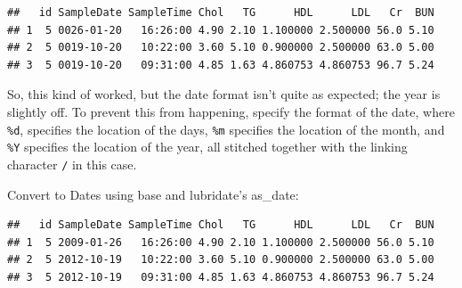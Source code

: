 \documentclass[
]{book}
\newenvironment{Shaded}{\begin{snugshade}}{\end{snugshade}}
\newcommand{\AttributeTok}[1]{\textcolor[rgb]{0.13,0.29,0.53}{#1}}
\newcommand{\CommentTok}[1]{\textcolor[rgb]{0.56,0.35,0.01}{\textit{#1}}}
\newcommand{\DataTypeTok}[1]{\textcolor[rgb]{0.13,0.29,0.53}{#1}}
\newcommand{\DecValTok}[1]{\textcolor[rgb]{0.00,0.00,0.81}{#1}}
\newcommand{\FunctionTok}[1]{\textcolor[rgb]{0.13,0.29,0.53}{\textbf{#1}}}
\newcommand{\NormalTok}[1]{#1}
\newcommand{\OtherTok}[1]{\textcolor[rgb]{0.56,0.35,0.01}{#1}}
\newcommand{\SpecialCharTok}[1]{\textcolor[rgb]{0.81,0.36,0.00}{\textbf{#1}}}
\newcommand{\StringTok}[1]{\textcolor[rgb]{0.31,0.60,0.02}{#1}}
\begin{document}
\begin{verbatim}
##   id SampleDate SampleTime Chol   TG      HDL      LDL   Cr  BUN
## 1  5 0026-01-20   16:26:00 4.90 2.10 1.100000 2.500000 56.0 5.10
## 2  5 0019-10-20   10:22:00 3.60 5.10 0.900000 2.500000 63.0 5.00
## 3  5 0019-10-20   09:31:00 4.85 1.63 4.860753 4.860753 96.7 5.24
\end{verbatim}

So, this kind of worked, but the date format isn't quite as expected; the year is slightly off. To prevent this from happening, specify the format of the date, where \texttt{\%d}, specifies the location of the days, \texttt{\%m} specifies the location of the month, and \texttt{\%Y} specifies the location of the year, all stitched together with the linking character \texttt{/} in this case.

Convert to Dates using base and lubridate's as\_date:

\begin{Shaded}
\end{Shaded}

\begin{verbatim}
##   id SampleDate SampleTime Chol   TG      HDL      LDL   Cr  BUN
## 1  5 2009-01-26   16:26:00 4.90 2.10 1.100000 2.500000 56.0 5.10
## 2  5 2012-10-19   10:22:00 3.60 5.10 0.900000 2.500000 63.0 5.00
## 3  5 2012-10-19   09:31:00 4.85 1.63 4.860753 4.860753 96.7 5.24
\end{verbatim}

\begin{Shaded}
\end{Shaded}
\end{document}
